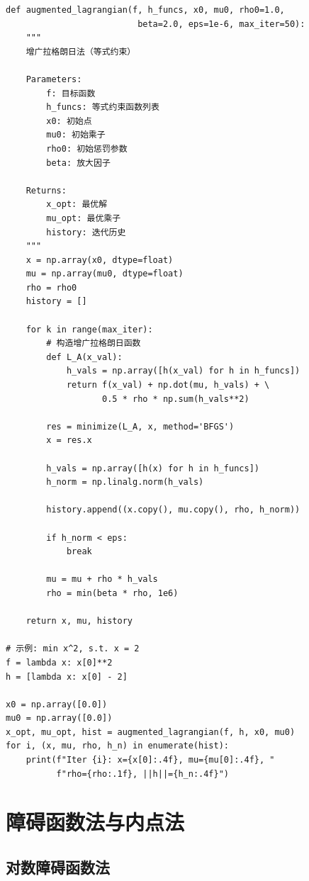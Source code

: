\begin{codebox}[增广拉格朗日法]
\begin{lstlisting}
def augmented_lagrangian(f, h_funcs, x0, mu0, rho0=1.0,
                          beta=2.0, eps=1e-6, max_iter=50):
    """
    增广拉格朗日法（等式约束）
    
    Parameters:
        f: 目标函数
        h_funcs: 等式约束函数列表
        x0: 初始点
        mu0: 初始乘子
        rho0: 初始惩罚参数
        beta: 放大因子
    
    Returns:
        x_opt: 最优解
        mu_opt: 最优乘子
        history: 迭代历史
    """
    x = np.array(x0, dtype=float)
    mu = np.array(mu0, dtype=float)
    rho = rho0
    history = []
    
    for k in range(max_iter):
        # 构造增广拉格朗日函数
        def L_A(x_val):
            h_vals = np.array([h(x_val) for h in h_funcs])
            return f(x_val) + np.dot(mu, h_vals) + \
                   0.5 * rho * np.sum(h_vals**2)
        
        res = minimize(L_A, x, method='BFGS')
        x = res.x
        
        h_vals = np.array([h(x) for h in h_funcs])
        h_norm = np.linalg.norm(h_vals)
        
        history.append((x.copy(), mu.copy(), rho, h_norm))
        
        if h_norm < eps:
            break
        
        mu = mu + rho * h_vals
        rho = min(beta * rho, 1e6)
    
    return x, mu, history

# 示例: min x^2, s.t. x = 2
f = lambda x: x[0]**2
h = [lambda x: x[0] - 2]

x0 = np.array([0.0])
mu0 = np.array([0.0])
x_opt, mu_opt, hist = augmented_lagrangian(f, h, x0, mu0)
for i, (x, mu, rho, h_n) in enumerate(hist):
    print(f"Iter {i}: x={x[0]:.4f}, mu={mu[0]:.4f}, "
          f"rho={rho:.1f}, ||h||={h_n:.4f}")
\end{lstlisting}
\end{codebox}

\section{障碍函数法与内点法}\label{sec:interior}

\subsection{对数障碍函数法}

